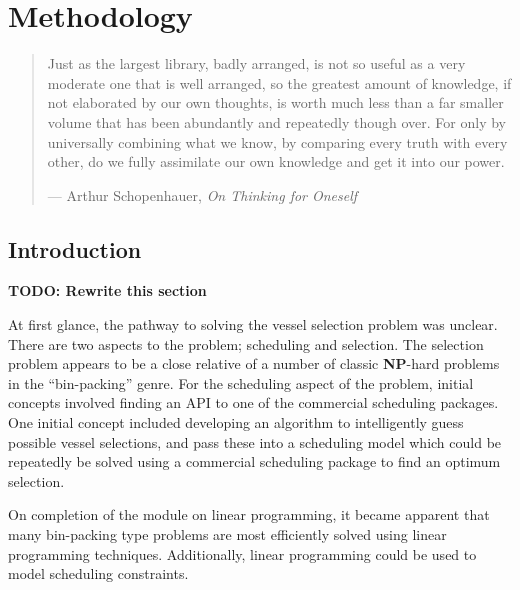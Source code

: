 %
%
%
%

\chapter{Methodology}\label{C.methodology}

\begin{quote}
Just as the largest library, badly arranged, is not so useful as a very
moderate one that is well arranged, so the greatest amount of knowledge, if not
elaborated by our own thoughts, is worth much less than a far smaller volume
that has been abundantly and repeatedly though over.  For only by universally
combining what we know, by comparing every truth with every other, do we fully
assimilate our own knowledge and get it into our power.

\hspace{2cm}--- Arthur Schopenhauer, \emph{On Thinking for Oneself}
\end{quote}

\section{Introduction}\label{S.intro4}

\textbf{TODO: Rewrite this section}

At first glance, the pathway to solving the vessel selection problem was
unclear.
There are two aspects to the problem; scheduling and selection.
The selection problem appears to be a close relative of a number of classic
\textbf{NP}-hard problems in the ``bin-packing'' genre.
For the scheduling aspect of the problem, initial concepts involved finding an
API to one of the commercial scheduling packages.
One initial concept included developing an algorithm to intelligently guess
possible vessel selections, and pass these into a scheduling model which
could be repeatedly be solved using a commercial scheduling package
to find an optimum selection.

On completion of the module on linear programming, it became apparent that
many bin-packing type problems are most efficiently solved using linear
programming techniques.
Additionally, linear programming could be used to model scheduling constraints.

